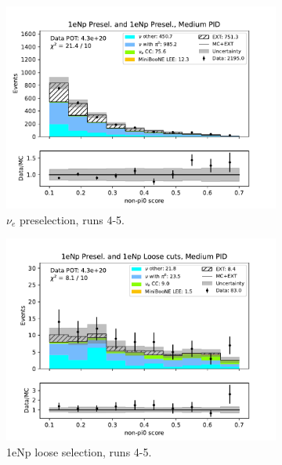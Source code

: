 \begin{figure}[H]
\begin{subfigure}{0.5\linewidth}
        \includegraphics[width=\linewidth]{technote/Sidebands/Figures/NearSideband/near_sideband_nonpi0_score_run4b4c4d5_NP_NP_MEDIUM_PID.pdf}
        \caption{$\nu_e$ preselection, runs 4-5.}
    \end{subfigure}%
    \begin{subfigure}{0.5\linewidth}
        \includegraphics[width=\linewidth]{technote/Sidebands/Figures/NearSideband/near_sideband_nonpi0_score_run4b4c4d5_NP_NPL_MEDIUM_PID.pdf}
        \caption{1eNp loose selection, runs 4-5.}
    \end{subfigure}    
    \begin{subfigure}{0.5\linewidth}

\end{subfigure}
\end{figure}
